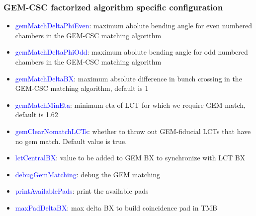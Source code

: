 \subsubsection{GEM-CSC factorized algorithm specific configuration}

\begin{itemize}
        \item \textcolor{blue}{gemMatchDeltaPhiEven}: maximum abolute bending angle for even numbered chambers in the GEM-CSC matching algorithm
        \item \textcolor{blue}{gemMatchDeltaPhiOdd}: maximum abolute bending angle for odd numbered chambers in the GEM-CSC matching algorithm
        \item \textcolor{blue}{gemMatchDeltaBX}: maximum absolute difference in bunch crossing in the GEM-CSC matching algorithm, default is 1
        \item \textcolor{blue}{gemMatchMinEta}: minimum eta of LCT for which we require GEM match, default is 1.62
        \item \textcolor{blue}{gemClearNomatchLCTs}: whether to throw out GEM-fiducial LCTs that have no gem match. Default value is true.  
        \item \textcolor{blue}{lctCentralBX}: value to be added to GEM BX to synchronize with LCT BX
        \item \textcolor{blue}{debugGemMatching}: debug the GEM matching
        \item \textcolor{blue}{printAvailablePads}: print the available pads
        \item \textcolor{blue}{maxPadDeltaBX}: max delta BX to build coincidence pad in TMB  
\end{itemize}


\newpage
